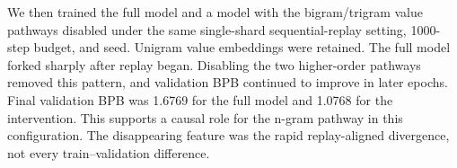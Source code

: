 We then trained the full model and a model with the bigram/trigram value pathways disabled under the same single-shard sequential-replay setting, 1000-step budget, and seed. Unigram value embeddings were retained. The full model forked sharply after replay began. Disabling the two higher-order pathways removed this pattern, and validation BPB continued to improve in later epochs. Final validation BPB was 1.6769 for the full model and 1.0768 for the intervention. This supports a causal role for the n-gram pathway in this configuration. The disappearing feature was the rapid replay-aligned divergence, not every train--validation difference.


